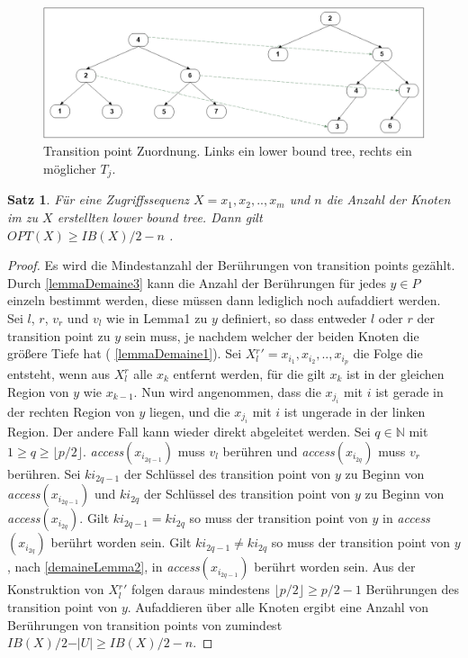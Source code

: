 \documentclass[a4paper,12pt]{article}
\begin{document}
 \begin{figure}[h]
	\centering
	\includegraphics[width=1\textwidth]{"Medien/Tango/transitionPoints"}
	\caption{Transition point Zuordnung. Links ein lower bound tree, rechts ein möglicher $T_j$.   }
	\label{fig:transitionPoints}
\end{figure}


\newtheorem{Satz2}{Satz}[section] \label{satzDemaine1}
\begin{Satz2} 
Für eine Zugriffssequenz $X = x_1, x_2,.., x_m$ und $n$ die Anzahl der Knoten im zu $X$ erstellten lower bound tree. Dann gilt\\	
$\mathit{OPT}\left(X\right) \geq \mathit{IB}\left(X\right) /2 - n$ .
\end{Satz2}
\begin{proof}
Es wird die Mindestanzahl der Berührungen von transition points gezählt. Durch \ref{lemmaDemaine3} kann die Anzahl der Berührungen für jedes $y \in P$ einzeln bestimmt werden, diese müssen dann lediglich noch aufaddiert werden. Sei $l$, $r$, $v_r$ und $v_l$ wie in Lemma1 zu $y$ definiert, so dass entweder $l$ oder $r$ der transition point zu $y$ sein muss, je nachdem welcher der beiden Knoten die größere Tiefe hat ( \ref{lemmaDemaine1}). Sei $X{^r_l}' = x_{i_1},x_{i_2},..,x_{i_p}$ die Folge die entsteht, wenn aus $X^r_l$ alle $x_k$ entfernt werden, für die gilt $x_k$ ist in der gleichen Region von $y$ wie $x_{k-1}$. Nun wird angenommen, dass die $x_{j_i}$ mit $i$ ist gerade in der rechten Region von $y$ liegen, und die $x_{j_i}$ mit $i$ ist ungerade in der linken Region. Der andere Fall kann wieder direkt abgeleitet werden. Sei $q \in \mathbb{N}$ mit $1 \geq q \geq \lfloor p / 2 \rfloor$. \textit{access}$\left( x_{i_{2q-1}} \right)$ muss $v_l$ berühren und \textit{access}$\left( x_{i_{2q}} \right)$ muss $v_r$ berühren. Sei $k{i_{2q-1}}$ der Schlüssel des transition point von $y$ zu Beginn von \textit{access}$\left( x_{i_{2q-1}} \right)$ und  $k{i_{2q}}$ der Schlüssel des transition point von $y$ zu Beginn von \textit{access}$\left( x_{i_{2q}} \right)$. Gilt $k{i_{2q-1}} = k{i_{2q}}$ so muss der transition point von $y$ in \textit{access}$\left( x_{i_{2q}} \right)$ berührt worden sein.  Gilt $k{i_{2q-1}} \ne k{i_{2q}}$ so muss der transition point von $y$, nach \ref{demaineLemma2}, in \textit{access}$\left( x_{i_{2q-1}} \right)$ berührt worden sein. Aus der Konstruktion von $X{^r_l}'$ folgen daraus mindestens $\lfloor p/2 \rfloor \geq p/2 - 1$ Berührungen des transition point von $y$. Aufaddieren über alle Knoten ergibt  eine Anzahl von Berührungen von transition points von zumindest $\mathit{IB}\left(X\right) /2 - \vert U \vert \geq \mathit{IB}\left(X\right) /2 - n$.
	
\end{proof}
\end{document}
